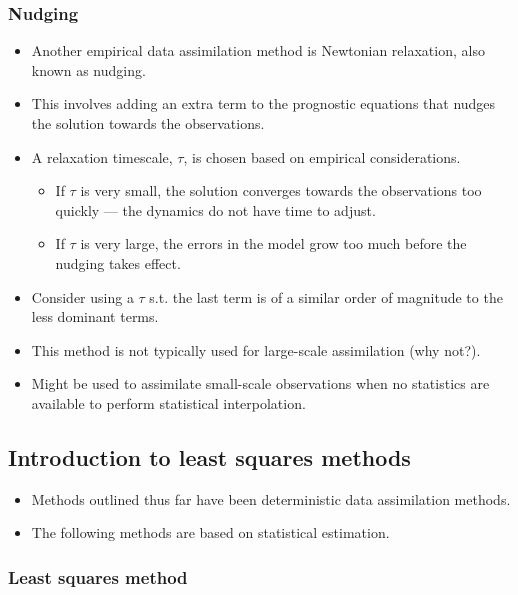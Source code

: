 \subsubsection{Nudging}
\label{subs:empirical:nudging}

\begin{itemize}
    \item Another empirical data assimilation method is Newtonian relaxation, also known as nudging.
    \item This involves adding an extra term to the prognostic equations that nudges the solution towards the observations.
    \item A relaxation timescale, $\tau$, is chosen based on empirical considerations.
    \begin{itemize}
        \item If $\tau$ is very small, the solution converges towards the observations too quickly --- the dynamics do not have time to adjust.
        \item If $\tau$ is very large, the errors in the model grow too much before the nudging takes effect.
    \end{itemize}
    \item Consider using a $\tau$ s.t. the last term is of a similar order of magnitude to the less dominant terms.
    \item This method is not typically used for large-scale assimilation (why not?).
    \item Might be used to assimilate small-scale observations when no statistics are available to perform statistical interpolation.
\end{itemize}

\subsection{Introduction to least squares methods}
\label{sub:data_assimilation:squares}

\begin{itemize}
    \item Methods outlined thus far have been deterministic data assimilation methods.
    \item The following methods are based on statistical estimation.
\end{itemize}

\subsubsection{Least squares method}
\label{subs:squares:lsm}

